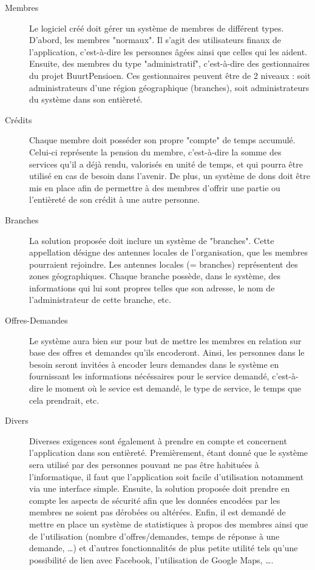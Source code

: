 \newpage
\begin{description}

\item [Membres]
Le logiciel créé doit gérer un système de membres de différent types.  D'abord,  les membres "normaux".  Il s'agit des utilisateurs finaux de l'application,  c'est-à-dire les personnes âgées ainsi que celles qui les aident.  Ensuite,  des membres du type "administratif",  c'est-à-dire des gestionnaires du projet BuurtPensioen.  Ces gestionnaires peuvent être de 2 niveaux : soit administrateurs d'une région géographique (branches),  soit administrateurs du système dans son entièreté.

\item [Crédits]
Chaque membre doit posséder son propre "compte" de temps accumulé.  Celui-ci représente la pension du membre,  c'est-à-dire la somme des services qu'il a déjà rendu,  valorisés en unité de temps,  et qui pourra être utilisé en cas de besoin dans l'avenir.  De plus,  un système de dons doit être mis en place afin de permettre à des membres d'offrir une partie ou l'entièreté de son crédit à une autre personne.

\item [Branches]
La solution proposée doit inclure un système de "branches".  Cette appellation désigne des antennes locales de l'organisation,  que les membres pourraient rejoindre.  Les antennes locales (= branches) représentent des zones géographiques.  
Chaque branche possède,  dans le système,  des informations qui lui sont propres telles que son adresse,  le nom de l'administrateur de cette branche,  etc.

\item [Offres-Demandes]
Le système aura bien sur pour but de mettre les membres en relation sur base des offres et demandes qu'ils encoderont.  Ainsi,  les personnes dans le besoin seront invitées à encoder leurs demandes dans le système en fournissant les informations nécéssaires pour le service demandé,  c'est-à-dire le moment où le sevice est demandé,  le type de service,  le temps que cela prendrait, etc.

\item [Divers]
Diverses exigences sont également à prendre en compte et concernent l'application dans son entièreté.  Premièrement,  étant donné que le système sera utilisé par des personnes pouvant ne pas être habituées à l'informatique,  il faut que l'application soit facile d'utilisation notamment via une interface simple.  Ensuite,  la solution proposée doit prendre en compte les aspects de sécurité afin que les données encodées par les membres ne soient pas dérobées ou altérées.  Enfin,  il est demandé de mettre en place un système de statistiques à propos des membres ainsi que de l'utilisation (nombre d'offres/demandes,  temps de réponse à une demande, \dots ) et d'autres fonctionnalités de plus petite utilité tels qu'une possibilité de lien avec Facebook,  l'utilisation de Google Maps, \dots .


\end{description}
